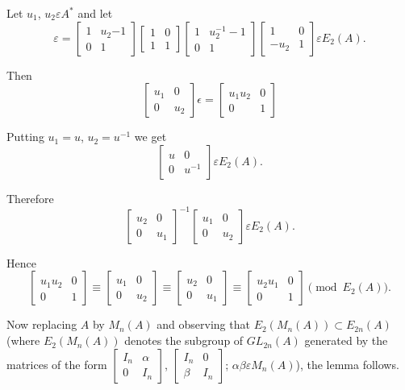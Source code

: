 \begin{Proof}
Let $u_1$, $u_2\varepsilon A^{\ast}$ and let 
$$
\varepsilon=
\begin{bmatrix}
1 & u_2{-1}\\
0 & 1
\end{bmatrix} \begin{bmatrix}
1 & 0\\
1 & 1
\end{bmatrix} \begin{bmatrix}
1 & u^{-1}_{2}-1\\
0 & 1
\end{bmatrix}\begin{bmatrix}
1 & 0\\
-u_2 & 1
\end{bmatrix} \varepsilon E_2(A).
$$

Then 
$$
\begin{bmatrix}
u_1 & 0\\
0 & u_2
\end{bmatrix} \epsilon = \begin{bmatrix}
u_1u_2 & 0\\
0 & 1
\end{bmatrix}
$$

Putting $u_1=u$, $u_2=u^{-1}$ we get
$$
\begin{bmatrix}
u & 0\\
0 & u^{-1}
\end{bmatrix} \varepsilon E_2(A).
$$

Therefore
$$
\begin{bmatrix}
u_2 & 0\\
0 & u_1
\end{bmatrix}^{-1}\begin{bmatrix}
u_1 & 0\\
0 & u_2
\end{bmatrix} \varepsilon E_2(A).
$$

Hence
$$
\begin{bmatrix}
u_1u_2 & 0\\
0 & 1
\end{bmatrix} \equiv \begin{bmatrix}
u_1 & 0\\
0 & u_2
\end{bmatrix} \equiv \begin{bmatrix}
u_2 & 0\\
0 & u_1
\end{bmatrix} \equiv \begin{bmatrix}
u_2u_1 &0\\
0 & 1
\end{bmatrix} \pmod {E_2(A)}.
$$

Now replacing $A$ by $M_n(A)$ and observing that $E_2(M_n(A))\subset
E_{2n}(A)$ (where $E_2(M_n(A))$ denotes the subgroup of $GL_{2n}(A)$
generated by the matrices of the form $\begin{bmatrix}
I_n & \alpha\\
0 & I_n
\end{bmatrix}$, $\begin{bmatrix}
I_n & 0\\
\beta & I_n
\end{bmatrix}$; $\alpha \beta \varepsilon M_n(A)$), the 
lemma follows.
\enprf
\end{Proof}

